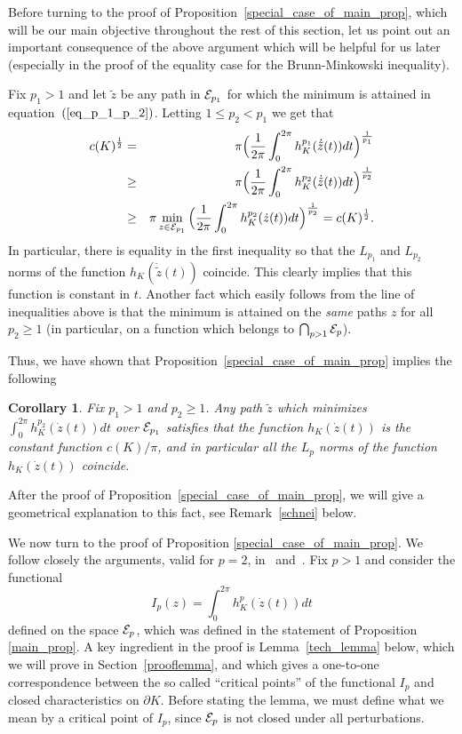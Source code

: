 \documentclass[12pt]{article}
\newtheorem{corollary}[lemma]{Corollary}
\begin{document}
Before turning to the proof of
Proposition~\ref{special_case_of_main_prop}, which will be our main
objective throughout the rest of this section, let us point out an
important consequence of the above argument which will be helpful
for us later (especially in the proof of the equality case for the
Brunn-Minkowski inequality).

Fix $p_1>1$ and let $\tilde z$ be any path in ${\cal E}_{p_1}$ for
which the minimum is attained in equation~$(\ref{eq_p_1_p_2})$.
Letting $1 \leq p_2 <p_1$ we get that
\begin{eqnarray*}
%
c(K)^{\frac 1 2} &= &\pi
\Big(\frac{1}{2\pi} \int_0^{2\pi} h_K^{p_1}(\dot{\tilde{z}}(t))dt\Big)^{\frac 1 {p_1} }\\
& \ge & \pi \Big( \frac{1}{2\pi}
\int_0^{2\pi} h_K^{p_2}(\dot{\tilde{z}}(t))dt\Big)^{\frac 1 {p_2}}\\
& \ge & \pi \min_{z\in {\cal E}_{p_1}} \Big( \frac{1}{2\pi}
\int_0^{2\pi} h_K^{p_2}(\dot{z}(t))dt\Big)^{\frac 1 {p_2}} =
c(K)^{\frac 1 2}.
\end{eqnarray*}
In particular, there is equality in the first inequality so that the
$L_{p_1}$ and $L_{p_2}$ norms of the function
$h_K(\dot{\tilde{z}}(t))$ coincide. This clearly implies that this
function is constant in $t$. Another fact which easily follows from
the line of inequalities above is that the minimum is attained on
the {\em same} paths $z$ for all $p_2\ge 1$ (in particular, on a
function which belongs to $\bigcap_{p>1}{\cal E}_p$).

Thus, we have shown that Proposition~\ref{special_case_of_main_prop}
implies the following

\begin{corollary}\label{gulu} {\it
Fix $p_1>1$ and $p_2\ge 1$. Any path $\tilde{z}$ which minimizes
$\int_0^{2 \pi} h_K^{p_2}(\dot{z}(t))dt$ over ${\cal E}_{p_1}$
satisfies that the function $h_K(\dot{z}(t))$ is the constant
function $c(K)/\pi$, and in particular all the $L_p$ norms of the
function $h_K(\dot{z}(t))$ coincide.}
\end{corollary}
After the proof of Proposition~\ref{special_case_of_main_prop}, we
will give a geometrical explanation to this fact, see
Remark~\ref{schnei} below.






We now turn to the proof of Proposition
\ref{special_case_of_main_prop}. We follow closely the arguments,
valid for $p = 2$, in~\cite{HZ} and~\cite{MZ}. Fix $p > 1$ and
consider the functional
%
\[I_p(z) =
\int_0^{2 \pi} h_K^p(\dot{z}(t))dt\]
%
defined on the space ${\cal E}_p$, which was defined in the
statement of Proposition \ref{main_prop}.
%
A key ingredient in the proof is Lemma~\ref{tech_lemma} below, which
we will prove in Section~\ref{prooflemma}, and which gives a
one-to-one correspondence between the so called ``critical points''
of the functional $I_p$ and closed characteristics on $\partial K$.
Before stating the lemma, we must define what we mean by a critical
point of $I_p$, since ${\cal E}_p$ is not closed under all
perturbations.
\end{document}
